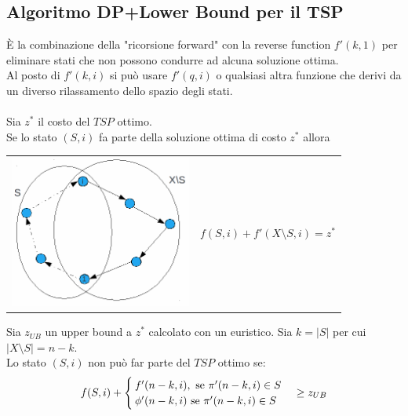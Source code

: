 \subsection{Algoritmo DP+Lower Bound per il TSP}
È la combinazione della "ricorsione forward" con la reverse function $f'(k,1)$ per eliminare stati che non possono condurre ad alcuna soluzione ottima.\\
Al posto di $f'(k,i)$ si può usare $f'(q,i)$ o qualsiasi altra funzione che derivi da un diverso rilassamento dello spazio degli stati.\\\\
Sia $z^{*}$ il costo del $TSP$ ottimo.\\
Se lo stato $(S,i)$ fa parte della soluzione ottima di costo $z^{*}$ allora
\begin{table}[!h]
	\begin{tabular}{m{8cm} m{7.5cm}}
		\includegraphics[height=5cm]{images/graph50.png} &
		\begin{equation}
			f(S,i)+f'(X\setminus S,i)=z^{*}
		\end{equation}
	\end{tabular}
\end{table}
Sia $z_{UB}$ un upper bound a $z^{*}$ calcolato con un euristico. Sia $k=|S|$ per cui $|X\setminus S|=n-k$.\\
Lo stato $(S,i)$ non può far parte del $TSP$ ottimo se:
\begin{equation}
	f(S,i)+
	\begin{cases}
		f'(n-k,i),\ \textnormal{se }\pi'(n-k,i)\in S \\
		\phi'(n-k,i)\ \textnormal{se }\pi'(n-k,i)\in S
	\end{cases}
	\ge z_{UB}
\end{equation}

